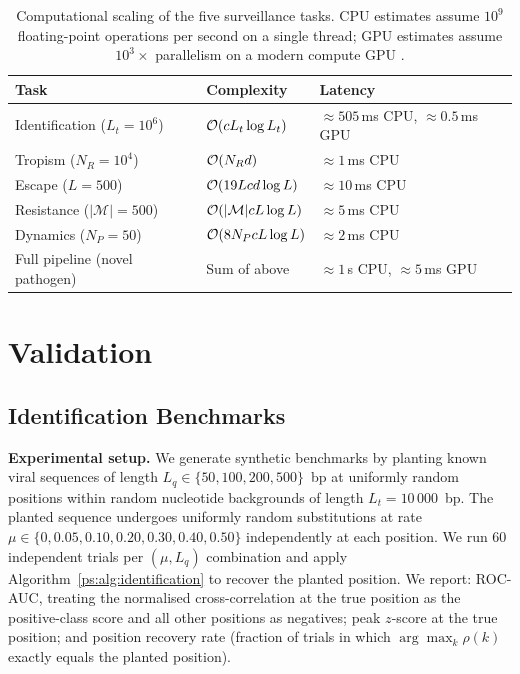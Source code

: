 \begin{table}[h]
\centering
\caption{Computational scaling of the five surveillance tasks. CPU estimates
assume $10^9$ floating-point operations per second on a single thread; GPU
estimates assume $10^3{\times}$ parallelism on a modern compute GPU
\citep{moreland2003, govindaraju2008}.}
\label{ps:tab:scaling}
\small
\begin{tabular}{@{}lll@{}}
\toprule
Task & Complexity & Latency \\
\midrule
Identification ($L_t = 10^6$) & $\mathcal{O}(c L_t \log L_t)$ &
  ${\approx}505$\,ms CPU, ${\approx}0.5$\,ms GPU \\
Tropism ($N_R = 10^4$) & $\mathcal{O}(N_R d)$ & ${\approx}1$\,ms CPU \\
Escape ($L = 500$) & $\mathcal{O}(19L c d \log L)$ & ${\approx}10$\,ms CPU \\
Resistance ($|\mathcal{M}| = 500$) & $\mathcal{O}(|\mathcal{M}| c L \log L)$ &
  ${\approx}5$\,ms CPU \\
Dynamics ($N_P = 50$) & $\mathcal{O}(8 N_P c L \log L)$ & ${\approx}2$\,ms CPU \\
Full pipeline (novel pathogen) & Sum of above & ${\approx}1$\,s CPU,
  ${\approx}5$\,ms GPU \\
\bottomrule
\end{tabular}
\end{table}

\section{Validation}
\label{ps:sec:validation}

\subsection{Identification Benchmarks}
\label{ps:subsec:id_bench}

\noindent\textbf{Experimental setup.} We generate synthetic benchmarks by
planting known viral sequences of length $L_q \in \{50, 100, 200, 500\}$~bp at
uniformly random positions within random nucleotide backgrounds of length
$L_t = 10\,000$~bp. The planted sequence undergoes uniformly random
substitutions at rate $\mu \in \{0, 0.05, 0.10, 0.20, 0.30, 0.40, 0.50\}$
independently at each position. We run 60 independent trials per
$(\mu, L_q)$ combination and apply Algorithm~\ref{ps:alg:identification} to
recover the planted position. We report: ROC-AUC, treating the normalised
cross-correlation at the true position as the positive-class score and all other
positions as negatives; peak $z$-score at the true position; and position
recovery rate (fraction of trials in which $\arg\max_k \rho(k)$ exactly equals
the planted position).

